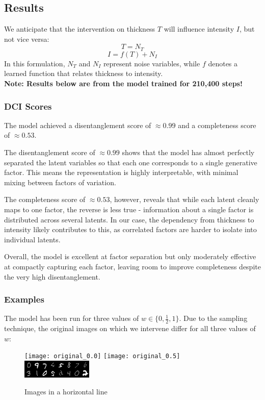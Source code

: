 \documentclass{article}
\begin{document}
	\subsection{Results}
	
	We anticipate that the intervention on thickness $T$ will influence intensity $I$, but not vice versa:
	$$ T = N_T $$
	$$ I = f(T) + N_I $$
	In this formulation, $N_T$ and $N_I$ represent noise variables, while $f$ denotes a learned function that relates thickness to intensity. \\
	
	\textbf{\normalsize Note: Results below are from the model trained for 210,400 steps!}
	
	\subsubsection*{DCI Scores}
	
	The model achieved a disentanglement score of $\approx 0.99$ and a completeness score of $\approx 0.53$.   
	
	The disentanglement score of $\approx 0.99$ shows that the model has almost perfectly separated the latent variables so that each one corresponds to a single generative factor. This means the representation is highly interpretable, with minimal mixing between factors of variation.  
	
	The completeness score of $\approx 0.53$, however, reveals that while each latent cleanly maps to one factor, the reverse is less true - information about a single factor is distributed across several latents. In our case, the dependency from thickness to intensity likely contributes to this, as correlated factors are harder to isolate into individual latents.  
	
	Overall, the model is excellent at factor separation but only moderately effective at compactly capturing each factor, leaving room to improve completeness despite the very high disentanglement.
	
	\subsubsection*{Examples}
	
	The model has been run for three values of $w \in \{0, \frac{1}{2}, 1\}$. Due to the sampling technique, the original images on which we intervene differ for all three values of $w$:
	
	\begin{figure}[H]
		\centering
		\texttt{[image: original\_0.0]} \hfill
		\texttt{[image: original\_0.5]} \hfill
		\includegraphics[width=0.3\textwidth]{original_1.0}
		\caption{Images in a horizontal line}
		\label{fig:original_images}
	\end{figure}
	
\end{document}
